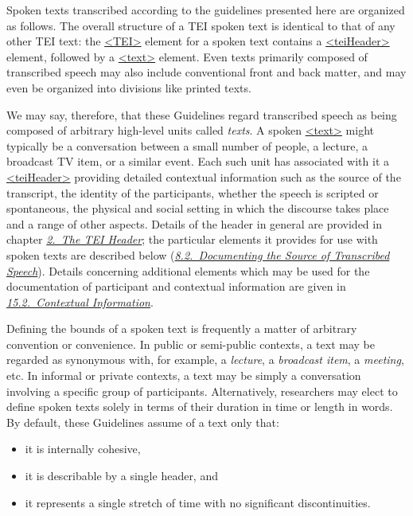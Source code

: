 Spoken texts transcribed according to the guidelines presented here are organized as follows. The overall structure of a TEI spoken text is identical to that of any other TEI text: the \hyperref[TEI.TEI]{<TEI>} element for a spoken text contains a \hyperref[TEI.teiHeader]{<teiHeader>} element, followed by a \hyperref[TEI.text]{<text>} element. Even texts primarily composed of transcribed speech may also include conventional front and back matter, and may even be organized into divisions like printed texts.\par
We may say, therefore, that these Guidelines regard transcribed speech as being composed of arbitrary high-level units called \textit{texts}. A spoken \hyperref[TEI.text]{<text>} might typically be a conversation between a small number of people, a lecture, a broadcast TV item, or a similar event. Each such unit has associated with it a \hyperref[TEI.teiHeader]{<teiHeader>} providing detailed contextual information such as the source of the transcript, the identity of the participants, whether the speech is scripted or spontaneous, the physical and social setting in which the discourse takes place and a range of other aspects. Details of the header in general are provided in chapter \textit{\hyperref[HD]{2.\ The TEI Header}}; the particular elements it provides for use with spoken texts are described below (\textit{\hyperref[HD32]{8.2.\ Documenting the Source of Transcribed Speech}}). Details concerning additional elements which may be used for the documentation of participant and contextual information are given in \textit{\hyperref[CCAH]{15.2.\ Contextual Information}}.\par
Defining the bounds of a spoken text is frequently a matter of arbitrary convention or convenience. In public or semi-public contexts, a text may be regarded as synonymous with, for example, a \textit{lecture}, a \textit{broadcast item}, a \textit{meeting}, etc. In informal or private contexts, a text may be simply a conversation involving a specific group of participants. Alternatively, researchers may elect to define spoken texts solely in terms of their duration in time or length in words. By default, these Guidelines assume of a text only that: \begin{itemize}
\item it is internally cohesive,
\item it is describable by a single header, and
\item it represents a single stretch of time with no significant discontinuities.
\end{itemize} \par
